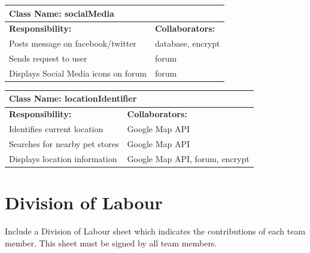 \documentclass[]{article}
\begin{document}
\begin{table}[H]
	\centering
	\begin{tabular}{|p{7cm}|p{7cm}|}
		\hline 
		\multicolumn{2}{|l|}{\textbf{Class Name:} socialMedia} \\
		\hline
		\textbf{Responsibility:} & \textbf{Collaborators:} \\
		\hline
		Posts message on facebook/twitter & database, encrypt \\
		\hline
		Sends request to user & forum \\
		\hline
		Displays Social Media icons on forum & forum \\
		\hline
	\end{tabular}
\end{table}
\begin{table}[H]
	\centering
	\begin{tabular}{|p{7cm}|p{7cm}|}
		\hline 
		\multicolumn{2}{|l|}{\textbf{Class Name:} locationIdentifier} \\
		\hline
		\textbf{Responsibility:} & \textbf{Collaborators:} \\
		\hline
		Identifies current location & Google Map API \\
		\hline
		Searches for nearby pet stores & Google Map API \\
		\hline
		Displays location information & Google Map API, forum, encrypt \\
		\hline
	\end{tabular}
\end{table}

\appendix
\section{Division of Labour}
\label{sec:division_of_labour}
Include a Division of Labour sheet which indicates the contributions of each team member. This sheet must be signed by all team members.

\newpage
\end{document}

